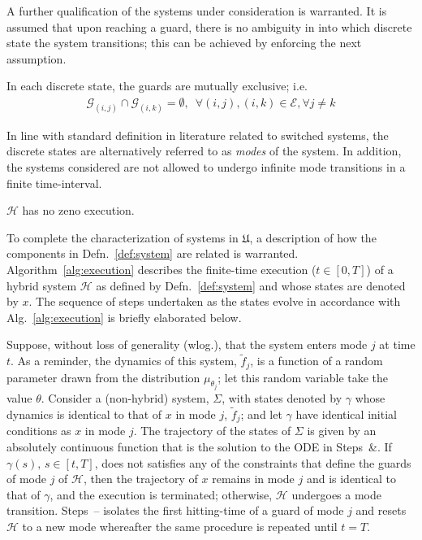 A further qualification of the systems under consideration is warranted. It is assumed that upon reaching a guard, there is no ambiguity in into which discrete state the system transitions; this can be achieved by enforcing the next assumption.
\begin{assump}
    In each discrete state, the guards are mutually exclusive; i.e.
    \begin{align}
    \mathcal G_{(i,j)}\cap \mathcal G_{(i,k)}=\emptyset,\phantom{8}\forall (i,j),(i,k)\in \mathcal E, \forall j\ne k
    \end{align}
\end{assump}
In line with standard definition in literature related to switched systems, the discrete states are alternatively referred to as {\em modes} of the system. In addition, the systems considered are not allowed to undergo infinite mode transitions in a finite time-interval.
\begin{assump}
  $\mathcal H$ has no zeno execution.
  \label{assump:zeno}
\end{assump}
To complete the characterization of systems in $\mathfrak{U}$, a description of how the components in Defn.~\ref{def:system} are related is warranted. Algorithm~\ref{alg:execution} describes the finite-time execution ($t\in [0,T]$) of a hybrid system $\mathcal H$ as defined by Defn.~\ref{def:system} and whose states are denoted by $x$. The sequence of steps undertaken as the states evolve in accordance with Alg.~\ref{alg:execution} is briefly elaborated below.
\par
Suppose, without loss of generality (wlog.), that the system enters mode $j$ at time $t$. As a reminder, the dynamics of this system, $\tilde f_j$, is a function of a random parameter drawn from the distribution $\mu_{\theta_j}$; let this random variable take the value $\theta$. Consider a (non-hybrid) system, $\Sigma$, with states denoted by $\gamma$ whose dynamics is identical to that of $x$ in mode $j$, $\tilde f_j$; and let $\gamma$ have identical initial conditions as $x$ in mode $j$. The trajectory of the states of $\Sigma$ is given by an absolutely continuous function that is the solution to the ODE in Steps~\&. If $\gamma(s),\,s\in [t,T]$, does not satisfies any of the constraints that define the guards of mode $j$ of $\mathcal H$, then the trajectory of $x$ remains in mode $j$ and is identical to that of $\gamma$, and the execution is terminated; otherwise, $\mathcal H$ undergoes a mode transition. Steps~-- isolates the first hitting-time of a guard of mode $j$ and resets $\mathcal H$ to a new mode whereafter the same procedure is repeated until $t=T$.
